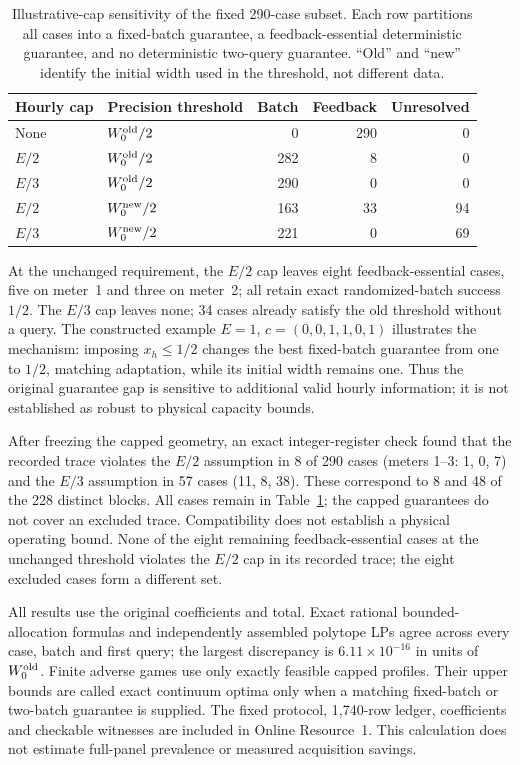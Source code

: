 \begin{table}[htbp]\centering\small
\caption{Illustrative-cap sensitivity of the fixed 290-case subset.
Each row partitions all cases into a fixed-batch guarantee, a
feedback-essential deterministic guarantee, and no deterministic
two-query guarantee. ``Old'' and ``new'' identify the initial width used
in the threshold, not different data.}
\label{tab:counter-caps}
\begin{tabular}{llrrr}\toprule
Hourly cap & Precision threshold & Batch & Feedback & Unresolved\\\midrule
None & $W_0^{\rm old}/2$ & 0 & 290 & 0\\
$E/2$ & $W_0^{\rm old}/2$ & 282 & 8 & 0\\
$E/3$ & $W_0^{\rm old}/2$ & 290 & 0 & 0\\
$E/2$ & $W_0^{\rm new}/2$ & 163 & 33 & 94\\
$E/3$ & $W_0^{\rm new}/2$ & 221 & 0 & 69\\\bottomrule
\end{tabular}\end{table}

At the unchanged requirement, the $E/2$ cap leaves eight feedback-essential
cases, five on meter~1 and three on meter~2; all retain exact randomized-batch
success $1/2$. The $E/3$ cap leaves none; 34 cases already satisfy the
old threshold without a query. The constructed example
$E=1$, $c=(0,0,1,1,0,1)$ illustrates the mechanism: imposing $x_h\leq1/2$
changes the best fixed-batch guarantee from one to $1/2$, matching
adaptation, while its initial width remains one.
Thus the original guarantee gap is sensitive to additional valid hourly
information; it is not established as robust to physical capacity bounds.

After freezing the capped geometry, an exact integer-register check found
that the recorded trace violates the $E/2$ assumption in 8 of 290 cases
(meters 1--3: 1, 0, 7) and the $E/3$ assumption in 57 cases (11, 8, 38).
These correspond to 8 and 48 of the 228 distinct blocks. All cases remain
in Table~\ref{tab:counter-caps}; the capped guarantees do not cover an
excluded trace. Compatibility does not establish a physical operating bound.
None of the eight remaining feedback-essential cases at the unchanged
threshold violates the $E/2$ cap in its recorded trace; the eight excluded
cases form a different set.

All results use the original coefficients and total. Exact rational
bounded-allocation formulas and independently assembled polytope LPs
agree across every case, batch and first query; the largest discrepancy
is $6.11\times10^{-16}$ in units of $W_0^{\rm old}$.
Finite adverse games use only exactly feasible capped profiles.
Their upper bounds are called exact continuum optima only when a
matching fixed-batch or two-batch guarantee is supplied.
The fixed protocol, 1,740-row ledger, coefficients and checkable witnesses
are included in Online Resource~1. This calculation does not estimate
full-panel prevalence or measured acquisition savings.
